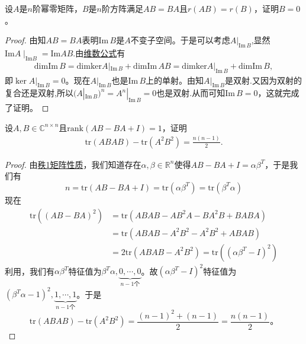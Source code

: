 \documentclass[../../main.tex]{subfiles}
\begin{document}
\begin{example}
设\( A \)是\( n \)阶幂零矩阵，\( B \)是\( n \)阶方阵满足\( AB = BA \)且\( r(AB) = r(B) \)，证明\( B = 0 \)。
\end{example}
\begin{proof}
由知\( AB = BA \)表明\( \text{Im}\, B \)是\( A \)不变子空间。于是可以考虑\( A|_{\text{Im}\, B} \),显然$\mathrm{Im} A\mid_{\mathrm{Im} B}=\mathrm{Im} AB$.由\hyperref[theorem:交和空间维数公式]{维数公式}有
\begin{align*}
\mathrm{dimIm}\,B=\mathrm{dimker}A|_{\mathrm{Im}\,B}+\mathrm{dimIm}\,AB=\mathrm{dimker}A|_{\mathrm{Im}\,B}+\mathrm{dimIm}\,B,
\end{align*}
即\( \ker A|_{\text{Im}\, B} = 0 \)。现在\( A|_{\text{Im}\, B} \)也是\( \text{Im}\, B \)上的单射。由知\( A|_{\text{Im}\, B} \)是双射.又因为双射的复合还是双射,所以\( (A|_{\text{Im}\, B})^n = A^n|_{\text{Im}\, B} = 0 \)也是双射.从而可知\( \text{Im}\, B = 0 \)，这就完成了证明。

\end{proof}

\begin{example}
设\( A,B \in \mathbb{C}^{n \times n} \)且\( \text{rank}(AB - BA + I) = 1 \)，证明
\begin{align}
\text{tr}(ABAB) - \text{tr}(A^2B^2) = \frac{n(n - 1)}{2}. \label{EQ:::-48972489-----12-1--23.116}
\end{align}
\end{example}
\begin{proof}
由\hyperref[lemma:秩1矩阵的列向量分解]{秩1矩阵性质}，我们知道存在\( \alpha,\beta \in \mathbb{R}^n \)使得\( AB - BA + I = \alpha\beta^T \)，于是我们有
\[
n = \text{tr}(AB - BA + I) = \text{tr}(\alpha\beta^T) = \text{tr}(\beta^T\alpha)
\]
现在
\[
\begin{aligned}
\text{tr}\left((AB - BA)^2\right) &= \text{tr}(ABAB - AB^2A - BA^2B + BABA) \\
&= \text{tr}(ABAB - A^2B^2 - A^2B^2 + ABAB) \\
&= 2\text{tr}(ABAB - A^2B^2) = \text{tr}\left((\alpha\beta^T - I)^2\right)
\end{aligned}
\]
利用，我们有\( \alpha\beta^T \)特征值为\( \beta^T\alpha,\underbrace{0,\cdots,0}_{n-1个} \)。故\( (\alpha\beta^T - I)^2 \)特征值为\( (\beta^T\alpha - 1)^2,\underbrace{1,\cdots,1}_{n-1个} \)。于是
\[
\text{tr}(ABAB) - \text{tr}(A^2B^2) = \frac{(n - 1)^2 + (n - 1)}{2} = \frac{n(n - 1)}{2}。
\]

\end{proof}
\end{document}
